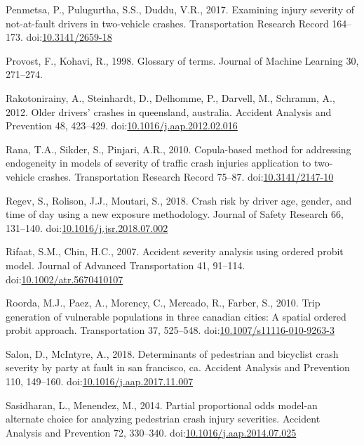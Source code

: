 \documentclass[]{elsarticle} %
\begin{document}
\leavevmode\hypertarget{ref-Penmetsa2017examining}{}%
Penmetsa, P., Pulugurtha, S.S., Duddu, V.R., 2017. Examining injury
severity of not-at-fault drivers in two-vehicle crashes. Transportation
Research Record 164--173.
doi:\href{https://doi.org/10.3141/2659-18}{10.3141/2659-18}

\leavevmode\hypertarget{ref-Provost1998glossary}{}%
Provost, F., Kohavi, R., 1998. Glossary of terms. Journal of Machine
Learning 30, 271--274.

\leavevmode\hypertarget{ref-Rakotonirainy2012older}{}%
Rakotonirainy, A., Steinhardt, D., Delhomme, P., Darvell, M., Schramm,
A., 2012. Older drivers' crashes in queensland, australia. Accident
Analysis and Prevention 48, 423--429.
doi:\href{https://doi.org/10.1016/j.aap.2012.02.016}{10.1016/j.aap.2012.02.016}

\leavevmode\hypertarget{ref-Rana2010copula}{}%
Rana, T.A., Sikder, S., Pinjari, A.R., 2010. Copula-based method for
addressing endogeneity in models of severity of traffic crash injuries
application to two-vehicle crashes. Transportation Research Record
75--87. doi:\href{https://doi.org/10.3141/2147-10}{10.3141/2147-10}

\leavevmode\hypertarget{ref-Regev2018crash}{}%
Regev, S., Rolison, J.J., Moutari, S., 2018. Crash risk by driver age,
gender, and time of day using a new exposure methodology. Journal of
Safety Research 66, 131--140.
doi:\href{https://doi.org/10.1016/j.jsr.2018.07.002}{10.1016/j.jsr.2018.07.002}

\leavevmode\hypertarget{ref-Rifaat2007accident}{}%
Rifaat, S.M., Chin, H.C., 2007. Accident severity analysis using ordered
probit model. Journal of Advanced Transportation 41, 91--114.
doi:\href{https://doi.org/10.1002/atr.5670410107}{10.1002/atr.5670410107}

\leavevmode\hypertarget{ref-Roorda2010trip}{}%
Roorda, M.J., Paez, A., Morency, C., Mercado, R., Farber, S., 2010. Trip
generation of vulnerable populations in three canadian cities: A spatial
ordered probit approach. Transportation 37, 525--548.
doi:\href{https://doi.org/10.1007/s11116-010-9263-3}{10.1007/s11116-010-9263-3}

\leavevmode\hypertarget{ref-Salon2018determinants}{}%
Salon, D., McIntyre, A., 2018. Determinants of pedestrian and bicyclist
crash severity by party at fault in san francisco, ca. Accident Analysis
and Prevention 110, 149--160.
doi:\href{https://doi.org/10.1016/j.aap.2017.11.007}{10.1016/j.aap.2017.11.007}

\leavevmode\hypertarget{ref-Sasidharan2014partial}{}%
Sasidharan, L., Menendez, M., 2014. Partial proportional odds model-an
alternate choice for analyzing pedestrian crash injury severities.
Accident Analysis and Prevention 72, 330--340.
doi:\href{https://doi.org/10.1016/j.aap.2014.07.025}{10.1016/j.aap.2014.07.025}
\end{document}
